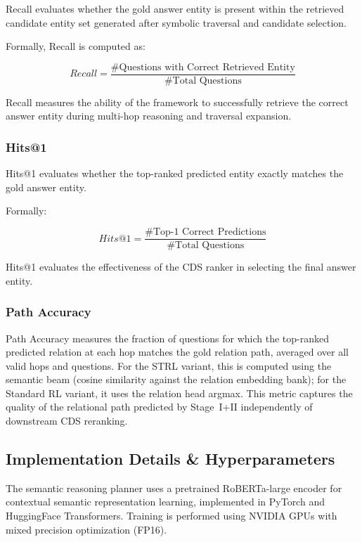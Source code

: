 \documentclass[10pt,conference]{IEEEtran}
\begin{document}
Recall evaluates whether the gold answer entity is present within the retrieved candidate entity set generated after symbolic traversal and candidate selection.

Formally, Recall is computed as:

\begin{equation}
Recall
=
\frac{
\#\text{Questions with Correct Retrieved Entity}
}{
\#\text{Total Questions}
}
\end{equation}

Recall measures the ability of the framework to successfully retrieve the correct answer entity during multi-hop reasoning and traversal expansion.

\subsubsection{Hits@1}

Hits@1 evaluates whether the top-ranked predicted entity exactly matches the gold answer entity.

Formally:

\begin{equation}
Hits@1
=
\frac{
\#\text{Top-1 Correct Predictions}
}{
\#\text{Total Questions}
}
\end{equation}

Hits@1 evaluates the effectiveness of the CDS ranker in selecting the final answer entity.

\subsubsection{Path Accuracy}

Path Accuracy measures the fraction of questions for which the top-ranked predicted relation at each hop matches the gold relation path, averaged over all valid hops and questions. For the STRL variant, this is computed using the semantic beam (cosine similarity against the relation embedding bank); for the Standard RL variant, it uses the relation head argmax. This metric captures the quality of the relational path predicted by Stage~I+II independently of downstream CDS reranking.


\subsection{Implementation Details \& Hyperparameters}

The semantic reasoning planner uses a pretrained RoBERTa-large encoder for contextual semantic representation learning, implemented in PyTorch and HuggingFace Transformers. Training is performed using NVIDIA GPUs with mixed precision optimization (FP16). 
\end{document}
